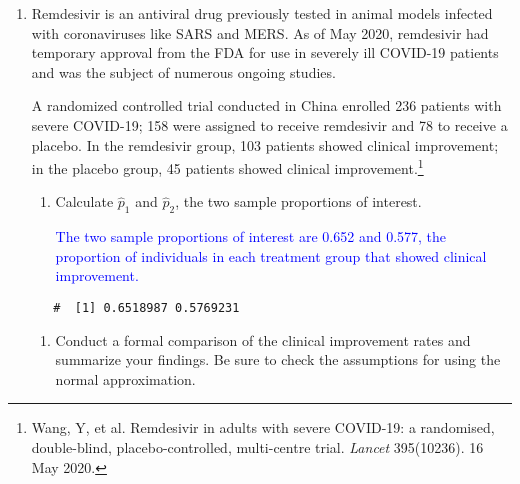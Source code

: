 \documentclass[letterpaper,12pt,twoside,]{pinp}
\begin{document}
\begin{enumerate}
\def\labelenumi{\arabic{enumi}.}
\setcounter{enumi}{1}
\item
  Remdesivir is an antiviral drug previously tested in animal models
  infected with coronaviruses like SARS and MERS. As of May 2020,
  remdesivir had temporary approval from the FDA for use in severely ill
  COVID-19 patients and was the subject of numerous ongoing studies.

  A randomized controlled trial conducted in China enrolled 236 patients
  with severe COVID-19; 158 were assigned to receive remdesivir and 78
  to receive a placebo. In the remdesivir group, 103 patients showed
  clinical improvement; in the placebo group, 45 patients showed
  clinical
  improvement.\footnote{Wang, Y, et al. Remdesivir in adults with severe COVID-19: a randomised, double-blind, placebo-controlled, multi-centre trial. \textit{Lancet} 395(10236). 16 May 2020.}

  \begin{enumerate}
  \def\labelenumii{\alph{enumii})}
  \item
    Calculate \(\hat{p}_1\) and \(\hat{p}_2\), the two sample
    proportions of interest.

    \textcolor{blue}{The two sample proportions of interest are 0.652 and 0.577, the proportion of individuals in each treatment group that showed clinical improvement.}
  \end{enumerate}

\begin{Shaded}
\begin{Highlighting}[]
\StringTok{ }\NormalTok{(}\NormalTok{, }\NormalTok{)}
\StringTok{ }\NormalTok{(}\NormalTok{, }\NormalTok{)}
\StringTok{ }\OperatorTok{/}
\end{Highlighting}
\end{Shaded}

  \begin{ShadedResult}
   \begin{verbatim}
   #  [1] 0.6518987 0.5769231
   \end{verbatim}
   \end{ShadedResult}

  \begin{enumerate}
  \def\labelenumii{\alph{enumii})}
  \setcounter{enumii}{1}
  \item
    Conduct a formal comparison of the clinical improvement rates and
    summarize your findings. Be sure to check the assumptions for using
    the normal approximation.


\end{enumerate}
\end{enumerate}
\end{document}
